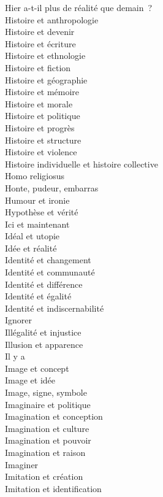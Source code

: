 \documentclass[a4paper,12pt]{article}
\begin{document}
Hier a-t-il plus de réalité que demain ? \\
Histoire et anthropologie \\
Histoire et devenir \\
Histoire et écriture \\
Histoire et ethnologie \\
Histoire et fiction \\
Histoire et géographie \\
Histoire et mémoire \\
Histoire et morale \\
Histoire et politique \\
Histoire et progrès \\
Histoire et structure \\
Histoire et violence \\
Histoire individuelle et histoire collective \\
Homo religiosus \\
Honte, pudeur, embarras \\
Humour et ironie \\
Hypothèse et vérité \\
Ici et maintenant \\
Idéal et utopie \\
Idée et réalité \\
Identité et changement \\
Identité et communauté \\
Identité et différence \\
Identité et égalité \\
Identité et indiscernabilité \\
Ignorer \\
Illégalité et injustice \\
Illusion et apparence \\
Il y a \\
Image et concept \\
Image et idée \\
Image, signe, symbole \\
Imaginaire et politique \\
Imagination et conception \\
Imagination et culture \\
Imagination et pouvoir \\
Imagination et raison \\
Imaginer \\
Imitation et création \\
Imitation et identification \\
\end{document}
